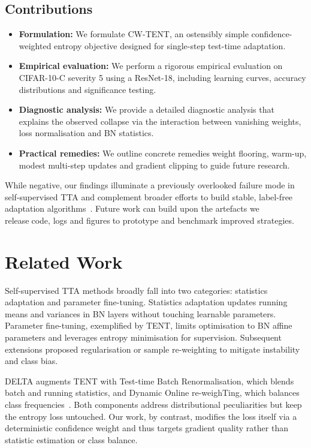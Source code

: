 \documentclass{article} %
\begin{document}
\subsection{Contributions}
\begin{itemize}
  \item \textbf{Formulation:} We formulate CW-TENT, an ostensibly simple confidence-weighted entropy objective designed for single-step test-time adaptation.
  \item \textbf{Empirical evaluation:} We perform a rigorous empirical evaluation on CIFAR-10-C severity 5 using a ResNet-18, including learning curves, accuracy distributions and significance testing.
  \item \textbf{Diagnostic analysis:} We provide a detailed diagnostic analysis that explains the observed collapse via the interaction between vanishing weights, loss normalisation and BN statistics.
  \item \textbf{Practical remedies:} We outline concrete remediesweight flooring, warm-up, modest multi-step updates and gradient clippingto guide future research.
\end{itemize}

While negative, our findings illuminate a previously overlooked failure mode in self-supervised TTA and complement broader efforts to build stable, label-free adaptation algorithms~\cite{zhao-2023-delta,author-year-test}. Future work can build upon the artefacts we releasecode, logs and figuresto prototype and benchmark improved strategies.

\section{Related Work}
\label{sec:related}
Self-supervised TTA methods broadly fall into two categories: statistics adaptation and parameter fine-tuning. Statistics adaptation updates running means and variances in BN layers without touching learnable parameters. Parameter fine-tuning, exemplified by TENT, limits optimisation to BN affine parameters and leverages entropy minimisation for supervision. Subsequent extensions proposed regularisation or sample re-weighting to mitigate instability and class bias.

DELTA augments TENT with Test-time Batch Renormalisation, which blends batch and running statistics, and Dynamic Online re-weighTing, which balances class frequencies~\cite{zhao-2023-delta}. Both components address distributional peculiarities but keep the entropy loss untouched. Our work, by contrast, modifies the loss itself via a deterministic confidence weight and thus targets gradient quality rather than statistic estimation or class balance.
\end{document}
